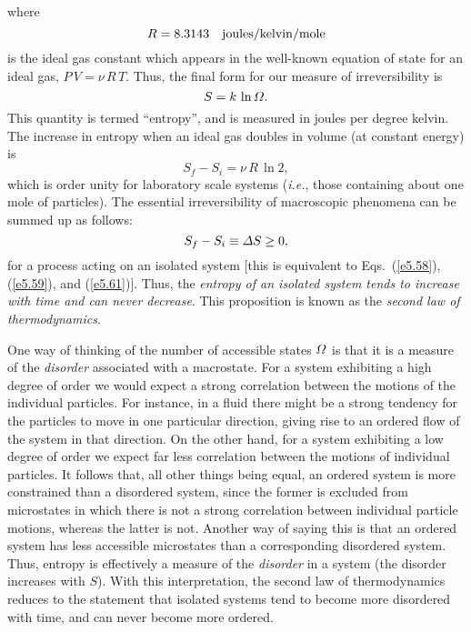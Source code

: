 where 
\begin{equation}
R= 8.3143 ~~~{\rm joules/kelvin/mole}
\end{equation}
is the ideal gas constant  which appears in the well-known equation of state for
an ideal gas, $P\,V=\nu \,R\,T$. Thus, the final form for our measure of irreversibility
is 
\begin{equation}
S = k \,\ln{\mit\Omega}.
\end{equation}
This quantity is termed ``entropy'', and is measured in joules per degree kelvin.
The increase in entropy when an ideal gas doubles in volume (at constant
energy) is
\begin{equation}
S_f - S_i = \nu \,R\, \ln 2,
\end{equation}
which is order unity for laboratory scale systems ({\em i.e.}, those containing about
one mole of particles).  The essential irreversibility of macroscopic phenomena
can be summed up as follows:
\begin{equation}
S_f - S_i \equiv {\mit\Delta} S \geq 0,
\end{equation}
for a process acting on an isolated system [this is equivalent to
Eqs.~(\ref{e5.58}), (\ref{e5.59}), and (\ref{e5.61})]. Thus, the {\em entropy of an isolated
system tends to increase with time and can never decrease}. This 
proposition is known
as the {\em second law of thermodynamics}.

One way of thinking of the number of accessible states ${\mit\Omega}$ 
is that it is a measure
of the {\em disorder}\/ associated with  a macrostate. For a system exhibiting
a high degree of order we would expect a strong correlation between the motions
of the individual particles. For instance, in a fluid there might be a strong tendency
for the particles to move in one particular direction, giving rise to
 an ordered flow of the
system in that direction. 
On the other hand, for a system exhibiting a low degree of order we expect
far less correlation between the motions of individual particles. It follows that,
all other things being equal, an ordered system is more constrained than a disordered
system, since the former is excluded from microstates in which there is not
a strong correlation between individual particle motions, whereas the latter is not.
Another way of saying this is that an ordered system has less accessible microstates
than a corresponding disordered system. Thus, entropy is
effectively  a measure of the {\em disorder}\/ 
 in a system (the disorder increases with $S$).
With this interpretation, the second law of thermodynamics reduces to the statement
that isolated systems tend to become more disordered with time, and  can never
become more ordered. 

